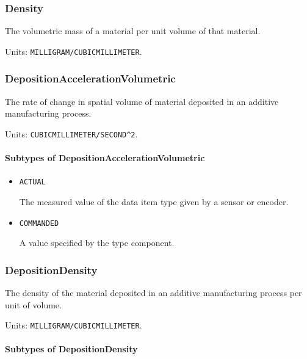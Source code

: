 \subsubsection{Density}
\label{sec:Density}



The volumetric mass of a material per unit volume of that material.


Units: \texttt{MILLIGRAM/CUBIC\textunderscore MILLIMETER}.

\subsubsection{DepositionAccelerationVolumetric}
\label{sec:DepositionAccelerationVolumetric}



The rate of change in spatial volume of material deposited in an additive manufacturing process.


Units: \texttt{CUBIC\textunderscore MILLIMETER/SECOND\^{}2}.

\paragraph{Subtypes of DepositionAccelerationVolumetric}\mbox{}
\label{sec:Subtypes of DepositionAccelerationVolumetric}

\begin{itemize}

\item \texttt{ACTUAL}


The measured value of the data item type given by a sensor or encoder.

\item \texttt{COMMANDED}


A value specified by the  type component.


\end{itemize}

\subsubsection{DepositionDensity}
\label{sec:DepositionDensity}



The density of the material deposited in an additive manufacturing process per unit of volume.


Units: \texttt{MILLIGRAM/CUBIC\textunderscore MILLIMETER}.

\paragraph{Subtypes of DepositionDensity}\mbox{}
\label{sec:Subtypes of DepositionDensity}

